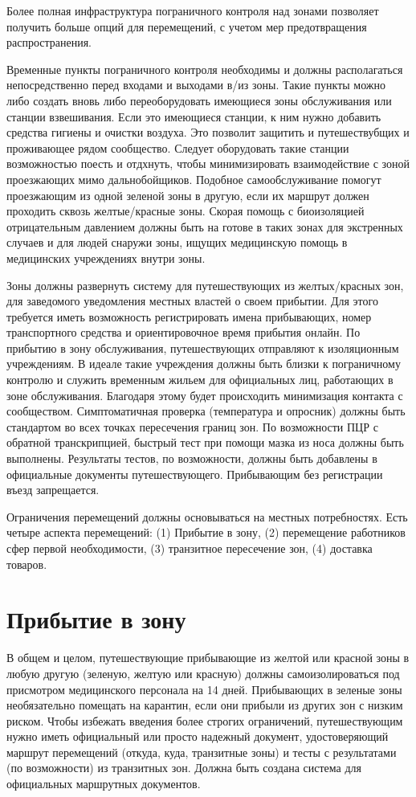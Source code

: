 \documentclass[onecolumn,journal]{IEEEtran}
\begin{document}
\begin{multicols}{2}
Более полная инфраструктура пограничного контроля над зонами позволяет получить больше опций для перемещений, с учетом мер предотвращения распространения.

Временные пункты пограничного контроля необходимы и должны располагаться непосредственно перед входами и выходами в/из зоны. Такие пункты можно либо создать вновь либо переоборудовать имеющиеся зоны обслуживания или станции взвешивания. Если это имеющиеся станции, к ним нужно добавить средства гигиены и очистки воздуха. Это позволит защитить и путешествубщих и проживающее рядом сообщество. Следует оборудовать такие станции возможностью поесть и отдхнуть, чтобы минимизировать взаимодействие с зоной проезжающих мимо дальнобойщиков. Подобное самообслуживание помогут проезжающим из одной зеленой зоны в другую, если их маршрут должен проходить сквозь желтые/красные зоны. Скорая помощь с биоизоляцией отрицательным давлением должны быть на готове в таких зонах для экстренных случаев и для людей снаружи зоны, ищущих медицинскую помощь в медицинских учреждениях внутри зоны.

Зоны должны развернуть систему для путешествующих из желтых/красных зон, для заведомого уведомления местных властей о своем прибытии. Для этого требуется иметь возможность регистрировать имена прибывающих, номер транспортного средства и ориентировочное время прибытия онлайн. По прибытию в зону обслуживания, путешествующих отправляют к изоляционным учреждениям. В идеале такие учреждения должны быть близки к пограничному контролю и служить временным жильем для официальных лиц, работающих в зоне обслуживания. Благодаря этому будет происходить минимизация контакта с сообществом. Симптоматичная проверка (температура и опросник) должны быть стандартом во всех точках пересечения границ зон. По возможности ПЦР с обратной транскрипцией, быстрый тест при помощи мазка из носа должны быть выполнены. Результаты тестов, по возможности, должны быть добавлены в официальные документы путешествующего. Прибывающим без регистрации въезд запрещается.

Ограничения перемещений должны основываться на местных потребностях. Есть четыре аспекта перемещений: (1) Прибытие в зону, (2) перемещение работников сфер первой необходимости, (3) транзитное пересечение зон, (4) доставка товаров.

\section{Прибытие в зону}

В общем и целом, путешествующие прибывающие из желтой или красной зоны в любую другую (зеленую, желтую или красную) должны самоизолироваться под присмотром медицинского персонала на 14 дней. Прибывающих в зеленые зоны необязательно помещать на карантин, если они прибыли из других зон с низким риском. Чтобы избежать введения более строгих ограничений, путешествующим нужно иметь официальный или просто надежный документ, удостоверяющий маршрут перемещений (откуда, куда, транзитные зоны) и тесты с результатами (по возможности) из транзитных зон. Должна быть создана система для официальных маршрутных документов.


\end{multicols}
\end{document}
